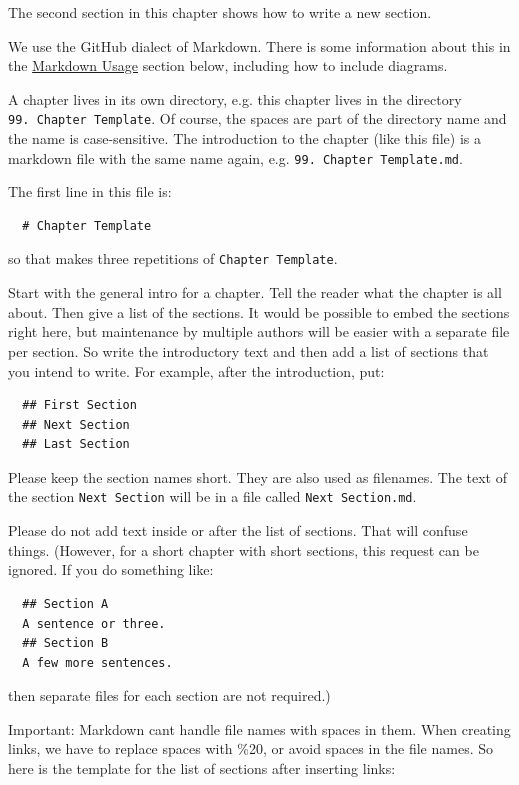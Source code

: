 \documentclass[
]{article}
\begin{document}
The second section in this chapter shows how to write a new section.

We use the GitHub dialect of Markdown. There is some information about
this in the \hyperref[markdown-usage]{Markdown Usage} section below,
including how to include diagrams.

A chapter lives in its own directory, e.g. this chapter lives in the
directory \texttt{99.\ Chapter\ Template}. Of course, the spaces are
part of the directory name and the name is case-sensitive. The
introduction to the chapter (like this file) is a markdown file with the
same name again, e.g. \texttt{99.\ Chapter\ Template.md}.

The first line in this file is:

\begin{verbatim}
  # Chapter Template
\end{verbatim}

so that makes three repetitions of \texttt{Chapter\ Template}.

Start with the general intro for a chapter. Tell the reader what the
chapter is all about. Then give a list of the sections. It would be
possible to embed the sections right here, but maintenance by multiple
authors will be easier with a separate file per section. So write the
introductory text and then add a list of sections that you intend to
write. For example, after the introduction, put:

\begin{verbatim}
  ## First Section
  ## Next Section
  ## Last Section
\end{verbatim}

Please keep the section names short. They are also used as filenames.
The text of the section \texttt{Next\ Section} will be in a file called
\texttt{Next\ Section.md}.

Please do not add text inside or after the list of sections. That will
confuse things. (However, for a short chapter with short sections, this
request can be ignored. If you do something like:

\begin{verbatim}
  ## Section A
  A sentence or three.
  ## Section B
  A few more sentences.
\end{verbatim}

then separate files for each section are not required.)

Important: Markdown can\textquotesingle t handle file names with spaces
in them. When creating links, we have to replace spaces with \%20, or
avoid spaces in the file names. So here is the template for the list of
sections after inserting links:
\end{document}
